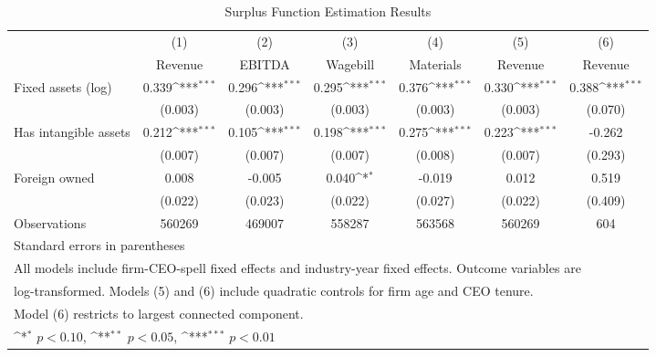 \begin{table}[htbp]\centering
\def\sym#1{\ifmmode^{#1}\else\(^{#1}\)\fi}
\caption{Surplus Function Estimation Results}
\begin{tabular}{l*{6}{c}}
\toprule
                    &\multicolumn{1}{c}{(1)}&\multicolumn{1}{c}{(2)}&\multicolumn{1}{c}{(3)}&\multicolumn{1}{c}{(4)}&\multicolumn{1}{c}{(5)}&\multicolumn{1}{c}{(6)}\\
                    &\multicolumn{1}{c}{Revenue}&\multicolumn{1}{c}{EBITDA}&\multicolumn{1}{c}{Wagebill}&\multicolumn{1}{c}{Materials}&\multicolumn{1}{c}{Revenue}&\multicolumn{1}{c}{Revenue}\\
\midrule
Fixed assets (log)  &       0.339\sym{***}&       0.296\sym{***}&       0.295\sym{***}&       0.376\sym{***}&       0.330\sym{***}&       0.388\sym{***}\\
                    &     (0.003)         &     (0.003)         &     (0.003)         &     (0.003)         &     (0.003)         &     (0.070)         \\
\addlinespace
Has intangible assets&       0.212\sym{***}&       0.105\sym{***}&       0.198\sym{***}&       0.275\sym{***}&       0.223\sym{***}&      -0.262         \\
                    &     (0.007)         &     (0.007)         &     (0.007)         &     (0.008)         &     (0.007)         &     (0.293)         \\
\addlinespace
Foreign owned       &       0.008         &      -0.005         &       0.040\sym{*}  &      -0.019         &       0.012         &       0.519         \\
                    &     (0.022)         &     (0.023)         &     (0.022)         &     (0.027)         &     (0.022)         &     (0.409)         \\
\midrule
Observations        &      560269         &      469007         &      558287         &      563568         &      560269         &         604         \\
\bottomrule
\multicolumn{7}{l}{\footnotesize Standard errors in parentheses}\\
\multicolumn{7}{l}{\footnotesize All models include firm-CEO-spell fixed effects and industry-year fixed effects. Outcome variables are}\\
\multicolumn{7}{l}{\footnotesize log-transformed. Models (5) and (6) include quadratic controls for firm age and CEO tenure.}\\
\multicolumn{7}{l}{\footnotesize Model (6) restricts to largest connected component.}\\
\multicolumn{7}{l}{\footnotesize \sym{*} \(p<0.10\), \sym{**} \(p<0.05\), \sym{***} \(p<0.01\)}\\
\end{tabular}
\end{table}
